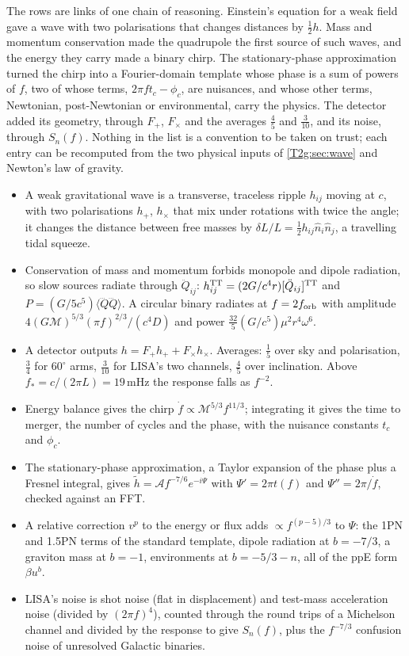 The rows are links of one chain of reasoning. Einstein's equation for a weak field gave a wave with two polarisations that changes distances by $\tfrac12h$. Mass and momentum conservation made the quadrupole the first source of such waves, and the energy they carry made a binary chirp. The stationary-phase approximation turned the chirp into a Fourier-domain template whose phase is a sum of powers of $f$, two of whose terms, $2\pi ft_c-\phi_c$, are nuisances, and whose other terms, Newtonian, post-Newtonian or environmental, carry the physics. The detector added its geometry, through $F_+$, $F_\times$ and the averages $\tfrac45$ and $\tfrac3{10}$, and its noise, through $S_n(f)$. Nothing in the list is a convention to be taken on trust; each entry can be recomputed from the two physical inputs of \cref{T2g:sec:wave} and Newton's law of gravity.

\begin{recap}
\begin{itemize}[itemsep=1pt]
  \item A weak gravitational wave is a transverse, traceless ripple $h_{ij}$ moving at $c$, with two polarisations $h_+$, $h_\times$ that mix under rotations with twice the angle; it changes the distance between free masses by $\delta L/L=\tfrac12h_{ij}\hat n_i\hat n_j$, a travelling tidal squeeze.
  \item Conservation of mass and momentum forbids monopole and dipole radiation, so slow sources radiate through $\ddot Q_{ij}$: $h^{\rm TT}_{ij}=(2G/c^4r)[\ddot Q_{ij}]^{\rm TT}$ and $P=(G/5c^5)\langle\dddot Q\dddot Q\rangle$. A circular binary radiates at $f=2f_{\rm orb}$ with amplitude $4(G\mathcal M)^{5/3}(\pi f)^{2/3}/(c^4D)$ and power $\tfrac{32}{5}(G/c^5)\mu^2r^4\omega^6$.
  \item A detector outputs $h=F_+h_++F_\times h_\times$. Averages: $\tfrac15$ over sky and polarisation, $\tfrac34$ for $60^\circ$ arms, $\tfrac3{10}$ for LISA's two channels, $\tfrac45$ over inclination. Above $f_*=c/(2\pi L)=19$\,mHz the response falls as $f^{-2}$.
  \item Energy balance gives the chirp $\dot f\propto\mathcal M^{5/3}f^{11/3}$; integrating it gives the time to merger, the number of cycles and the phase, with the nuisance constants $t_c$ and $\phi_c$.
  \item The stationary-phase approximation, a Taylor expansion of the phase plus a Fresnel integral, gives $\tilde h=\mathcal Af^{-7/6}e^{-i\Psi}$ with $\Psi'=2\pi t(f)$ and $\Psi''=2\pi/\dot f$, checked against an FFT.
  \item A relative correction $v^p$ to the energy or flux adds $\propto f^{(p-5)/3}$ to $\Psi$: the 1PN and 1.5PN terms of the standard template, dipole radiation at $b=-7/3$, a graviton mass at $b=-1$, environments at $b=-5/3-n$, all of the ppE form $\beta u^b$.
  \item LISA's noise is shot noise (flat in displacement) and test-mass acceleration noise (divided by $(2\pi f)^4$), counted through the round trips of a Michelson channel and divided by the response to give $S_n(f)$, plus the $f^{-7/3}$ confusion noise of unresolved Galactic binaries.
\end{itemize}
\end{recap}

